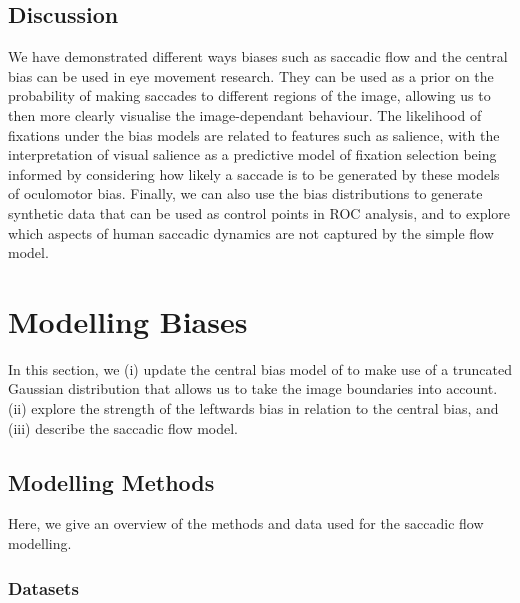 \documentclass[a4paper, twocolumn, oneside, 10pt]{article}
\begin{document}
\subsection{Discussion}

We have demonstrated different ways biases such as saccadic flow and the central bias can be used in eye movement research. They can be used as a prior on the probability of making saccades to different regions of the image, allowing us to then more clearly visualise the image-dependant behaviour. The likelihood of fixations under the bias models are related to features such as salience, with the interpretation of visual salience as a predictive model of fixation selection being informed by considering how likely a saccade is to be generated by these models of oculomotor bias. Finally, we can also use the bias distributions to generate synthetic data that can be used as control points in ROC analysis, and to explore which aspects of human saccadic dynamics are not captured by the simple flow model. 

\section{Modelling Biases}
\label{sec:biases}

In this section, we (i) update the central bias model of \cite{clarke-tatler2014} to make use of a truncated Gaussian distribution that allows us to take the image boundaries into account. (ii) explore the strength of the leftwards bias in relation to the central bias, and (iii) describe the saccadic flow model. 


\subsection{Modelling Methods}
\label{sec:modellingMethods}

Here, we give an overview of the methods and data used for the saccadic flow modelling.

\subsubsection{Datasets}
\end{document}
